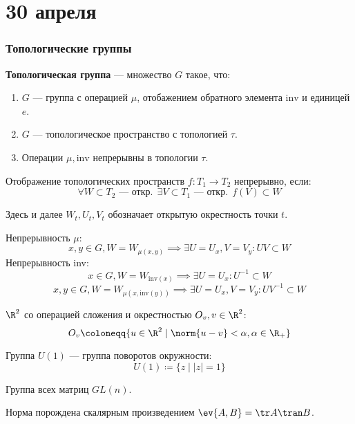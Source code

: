 \chapter{30 апреля}

\subsection{Топологические группы}

\begin{definition}
	\textbf{Топологическая группа} --- множество \(G\) такое, что:
	\begin{enumerate}
		\item \(G\) --- группа с операцией \(\mu\), отобажением обратного элемента \(\mathrm{inv}\) и единицей \(e\).
		\item \(G\) --- топологическое пространство с топологией \(\tau\).
		\item Операции \(\mu, \mathrm{inv}\) непрерывны в топологии \(\tau\).
	\end{enumerate}
\end{definition}

\begin{remark}
	Отображение топологических пространств \(f : T_1 \to T_2\) непрерывно, если:
	\[\forall W \subset T_2 \text{ --- откр.} \ \ \exists V \subset T_1 \text{ --- откр.} \ \ f(V) \subset W\]
\end{remark}

\begin{remark}
	Здесь и далее \(W_t, U_t, V_t\) обозначает открытую окрестность точки \(t\).
\end{remark}
Непрерывность \(\mu\):
\[x, y \in G, W = W_{\mu(x, y)} \implies \exists U = U_x, V = V_y : UV \subset W\]
Непрерывность inv:
\[x \in G, W = W_{\mathrm{inv}(x)} \implies \exists U = U_x : U^{-1} \subset W\]
\[x, y \in G, W = W_{\mu(x, \mathrm{inv}(y))} \implies \exists U = U_x, V = V_y : UV^{-1} \subset W\]

\begin{example}
	\(\R^2\) со операцией сложения и окрестностью \(O_v, v \in \R^2\):
	\[O_v \coloneqq \{u \in \R^2 \mid \norm{u - v} < \alpha, \alpha \in \R_+\}\]
\end{example}

\begin{example}
	Группа \(U(1)\) --- группа поворотов окружности:
	\[U(1) \coloneqq \{z \mid |z| = 1\}\]
\end{example}

\begin{example}
	Группа всех матриц \(GL(n)\).

	Норма порождена скалярным произведением \(\ev{A, B} = \tr A\tran B\).
\end{example}

